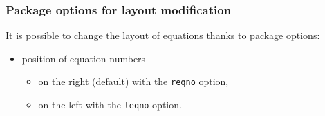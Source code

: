 \documentclass[11pt]{beamer}
\begin{document}
\begin{frame}
	\frametitle{Package options for layout modification}

	It is possible to change the layout of equations thanks to package options:
	\begin{itemize}
		\item position of equation numbers
		\begin{itemize}
			\item on the right (default) with the \texttt{reqno} option,
			\item on the left with the \texttt{leqno} option.
		\end{itemize}
	\end{itemize}
\end{frame}


\end{document}

